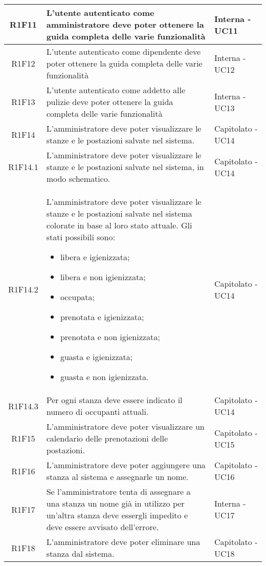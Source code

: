 \begin{center}
\begin{longtable}{|c|p{10cm}|p{4cm}|}
		\hline
		R1F11	&	L'utente autenticato come amministratore deve poter ottenere la guida completa delle varie funzionalità& Interna - UC11	\\
		\hline
		R1F12	&	L'utente autenticato come dipendente deve poter ottenere la guida completa delle varie funzionalità& Interna - UC12	\\
		\hline
		R1F13	&	L'utente autenticato come addetto alle pulizie deve poter ottenere la guida completa delle varie funzionalità& Interna - UC13	\\
		\hline
		R1F14&L'amministratore deve poter visualizzare le stanze e le postazioni salvate nel sistema.& Capitolato - UC14	\\
		\hline
		R1F14.1&L'amministratore deve poter visualizzare le stanze e le postazioni salvate nel sistema, in modo schematico.& Capitolato - UC14	\\
		\hline
		R1F14.2&L'amministratore deve poter visualizzare le stanze e le postazioni salvate nel sistema colorate in base al loro stato attuale. Gli stati possibili sono:
		\begin{itemize}
			\item libera e igienizzata;
			\item libera e non igienizzata;
			\item occupata;
			\item prenotata e igienizzata;
			\item prenotata e non igienizzata;
			\item guasta e igienizzata;
			\item guasta e non igienizzata.
		\end{itemize}& Capitolato - UC14	\\
		\hline
		R1F14.3&Per ogni stanza deve essere indicato il numero di occupanti attuali.	& Capitolato - UC14	\\
		\hline
		R1F15&L'amministratore deve poter visualizzare un calendario delle prenotazioni delle postazioni.	& Capitolato - UC15	\\
		\hline
		R1F16&L'amministratore deve poter aggiungere una stanza al sistema e assegnarle un nome.	& Capitolato - UC16	\\
		\hline
		R1F17 & Se l'amministratore tenta di assegnare a una stanza un nome già in utilizzo per un'altra stanza deve essergli impedito e deve essere avvisato dell'errore. & Interna - UC17 \\
		\hline
		R1F18&L'amministratore deve poter eliminare una stanza dal sistema.	& Capitolato - UC18	\\

\end{longtable}
\end{center}
